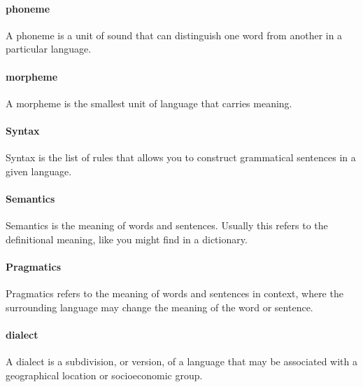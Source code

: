 \documentclass[
]{krantz}
\begin{document}
\hypertarget{phoneme}{%
\paragraph*{phoneme}\label{phoneme}}

A phoneme is a unit of sound that can distinguish one word from another in a particular language.

\hypertarget{morpheme}{%
\paragraph*{morpheme}\label{morpheme}}

A morpheme is the smallest unit of language that carries meaning.

\hypertarget{syntax}{%
\paragraph*{Syntax}\label{syntax}}

Syntax is the list of rules that allows you to construct grammatical sentences in a given language.

\hypertarget{semantics}{%
\paragraph*{Semantics}\label{semantics}}

Semantics is the meaning of words and sentences. Usually this refers to the definitional meaning, like you might find in a dictionary.

\hypertarget{pragmatics}{%
\paragraph*{Pragmatics}\label{pragmatics}}

Pragmatics refers to the meaning of words and sentences in context, where the surrounding language may change the meaning of the word or sentence.

\hypertarget{dialect}{%
\paragraph*{dialect}\label{dialect}}

A dialect is a subdivision, or version, of a language that may be associated with a geographical location or socioeconomic group.
\end{document}
